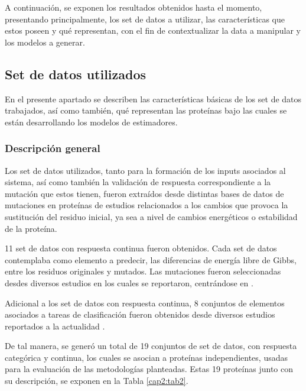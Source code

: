 A continuación, se exponen los resultados obtenidos hasta el momento, presentando principalmente, los set de datos a utilizar, las características que estos poseen y qué representan, con el fin de contextualizar la data a manipular y los modelos a generar.

\subsection{Set de datos utilizados}

En el presente apartado se describen las características básicas de los set de datos trabajados, así como también, qué representan las proteínas bajo las cuales se están desarrollando los modelos de estimadores.

\subsubsection{Descripción general}

Los set de datos utilizados, tanto para la formación de los inputs asociados al sistema, así como también la validación de respuesta correspondiente a la mutación que estos tienen, fueron extraídos desde distintas bases de datos de mutaciones en proteínas de estudios relacionados a los cambios que provoca la sustitución del residuo inicial, ya sea a nivel de cambios energéticos o estabilidad de la proteína.

11 set de datos con respuesta continua fueron obtenidos. Cada set de datos contemplaba como elemento a predecir, las diferencias de energía libre de Gibbs, entre los residuos originales y mutados. Las mutaciones fueron seleccionadas desdes diversos estudios en los cuales se reportaron, centrándose en \cite{Wainreb2011, Sun2017, petukh2016saambe, Alexov2012,prot20185}.

Adicional a los set de datos con respuesta continua, 8 conjuntos de elementos asociados a tareas de clasificación fueron obtenidos desde diversos estudios reportados a la actualidad \cite{ancien2018prediction, broom2017computational, capriotti2008three, quan2016strum, Capriotti2005, 1gzp030, Khan2010, masso2008accurate, getov2016saafec}. 

De tal manera, se generó un total de 19 conjuntos de set de datos, con respuesta categórica y continua, los cuales se asocian a proteínas independientes, usadas para la evaluación de las metodologías planteadas. Estas 19 proteínas junto con su descripción, se exponen en la Tabla \ref{cap2:tab2}.


